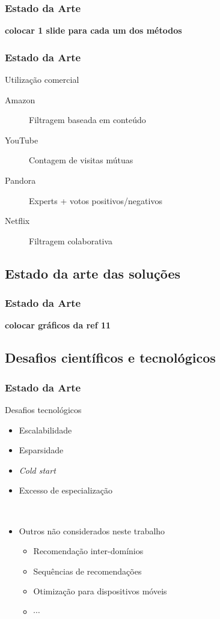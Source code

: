 \begin{frame}
\frametitle{Estado da Arte}
\textbf{colocar 1 slide para cada um dos métodos}
\end{frame}

\begin{frame}
\frametitle{Estado da Arte}

Utilização comercial \cite{chiang2012networked}

\begin{description}
\item[Amazon] Filtragem baseada em conteúdo
\item[YouTube] Contagem de visitas mútuas
\item[Pandora] Experts + votos positivos/negativos
\item[Netflix] Filtragem colaborativa
\end{description}
\end{frame}

\subsection{Estado da arte das soluções} %
\label{sub:estado_da_arte_das_solu_es_}
\begin{frame}
\frametitle{Estado da Arte}

\textbf{colocar gráficos da ref 11}
\end{frame}


\subsection{Desafios científicos e tecnológicos} %
\label{sub:desafios_cient_ficos_e_tecnol_gicos_}

\begin{frame}
\frametitle{Estado da Arte}
\begin{block}{Desafios tecnológicos}
\begin{itemize}
	\item Escalabilidade
	\item Esparsidade
	\item \textit{Cold start}
	\item Excesso de especialização \par{~}
	\item Outros não considerados neste trabalho
	\begin{itemize}
		\item Recomendação inter-domínios
		\item Sequências de recomendações
		\item Otimização para dispositivos móveis
		\item $\cdots$
	\end{itemize}
\end{itemize}
\end{block}
\end{frame}